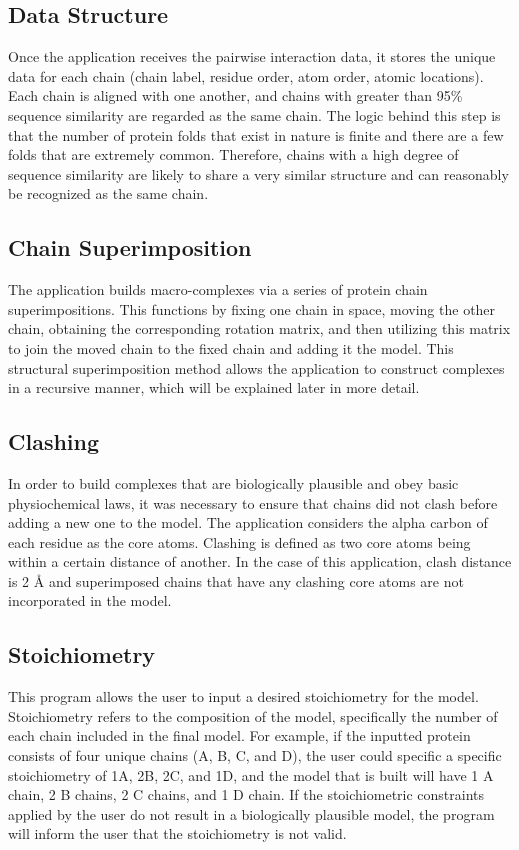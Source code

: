 \documentclass[a4paper,12pt]{article}
\begin{document}
\subsection{Data Structure}
Once the application receives the pairwise interaction data, it stores the unique data for each chain (chain label, residue order, atom order, atomic locations). Each chain is aligned with one another, and chains with greater than 95\% sequence similarity are regarded as the same chain. The logic behind this step is that the number of protein folds that exist in nature is finite and there are a few folds that are extremely common. Therefore, chains with a high degree of sequence similarity are likely to share a very similar structure and can reasonably be recognized as the same chain.  
\subsection{Chain Superimposition}
The application builds macro-complexes via a series of protein chain superimpositions. This functions by fixing one chain in space, moving the other chain, obtaining the corresponding rotation matrix, and then utilizing this matrix to join the moved chain to the fixed chain and adding it the model. This structural superimposition method allows the application to construct complexes in a recursive manner, which will be explained later in more detail. 
\subsection{Clashing}
In order to build complexes that are biologically plausible and obey basic physiochemical laws, it was necessary to ensure that chains did not clash before adding a new one to the model. The application considers the alpha carbon of each residue as the core atoms. Clashing is defined as two core atoms being within a certain distance of another. In the case of this application, clash distance is 2 Å and superimposed chains that have any clashing core atoms are not incorporated in the model. 
\subsection{Stoichiometry}
This program allows the user to input a desired stoichiometry for the model. Stoichiometry refers to the composition of the model, specifically the number of each chain included in the final model. For example, if the inputted protein consists of four unique chains (A, B, C, and D), the user could specific a specific stoichiometry of 1A, 2B, 2C, and 1D, and the model that is built will have 1 A chain, 2 B chains, 2 C chains, and 1 D chain. If the stoichiometric constraints applied by the user do not result in a biologically plausible model, the program will inform the user that the stoichiometry is not valid. 
\end{document}
